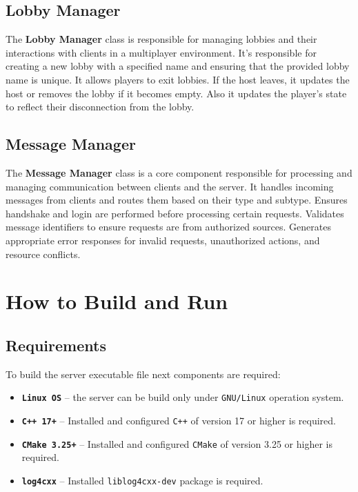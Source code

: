 \documentclass[english, sem, kiv, he, iso690alph, pdf, viewonly]{fasthesis}
\begin{document}
\subsection{Lobby Manager}
The \textbf{Lobby Manager} class is responsible for managing lobbies and their interactions with clients in a multiplayer environment. It's responsible for creating a new lobby with a specified name and ensuring that the provided lobby name is unique. It allows players to exit lobbies. If the host leaves, it updates the host or removes the lobby if it becomes empty. Also it updates the player's state to reflect their disconnection from the lobby. 

\subsection{Message Manager}
The \textbf{Message Manager} class is a core component responsible for processing and managing communication between clients and the server. It handles incoming messages from clients and routes them based on their type and subtype. Ensures handshake and login are performed before processing certain requests. Validates message identifiers to ensure requests are from authorized sources. Generates appropriate error responses for invalid requests, unauthorized actions, and resource conflicts. 

\section{How to Build and Run}

\subsection{Requirements}
To build the server executable file next components are required:
\begin{itemize}
	\item \textbf{\texttt{Linux OS}} -- the server can be build only under \texttt{GNU/Linux} operation system.
	\item \textbf{\texttt{C++ 17+}} -- Installed and configured \texttt{C++} of version 17 or higher is required.
	\item \textbf{\texttt{CMake 3.25+}} -- Installed and configured \texttt{CMake} of version 3.25 or higher is required.
	\item \textbf{\texttt{log4cxx}} -- Installed \texttt{liblog4cxx-dev} package is required.
\end{itemize}
\end{document}
